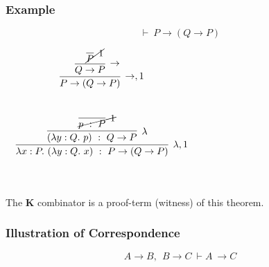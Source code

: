 \documentclass{beamer}
\theoremstyle{indentDefn} \newtheorem{defn}[]{Definition}
\begin{document}
\begin{frame}
  \frametitle{Example}

  $$ \vdash \ P \to (Q \to P)$$

  \vspace{1cm}

  \begin{center}
    $\begin{array}{c}
      
      \begin{array}{c}
        \infer[\to, 1]{P \to (Q \to P)}
          {\infer[\to]{Q \to P}
            {\cancel{\infer[1]{P}{}}}}
      \end{array}

      \vspace{1cm}

      \\
      
      \vspace{1cm}

      \begin{array}{c}
        \infer[\lambda, 1]{\lambda x : P. \ (\lambda y : Q. \ x) \ : \ P \to (Q \to P)}
          {\infer[\lambda]{(\lambda y : Q. \ p) \ : \ Q \to P}
            {\cancel{\infer[1]{p \ : \ P}{}}}}
      \end{array}

    \end{array}$
  \end{center}
  
  The \textbf{K} combinator is a proof-term (witness) of this theorem.
  
\end{frame}

\begin{frame}
  \frametitle{Illustration of Correspondence}

  $$ A \to B, \ \ B \to C \ \vdash A \ \to C$$
  
  
  
  	\vspace{70mm}
  
\end{frame}
\end{document}
